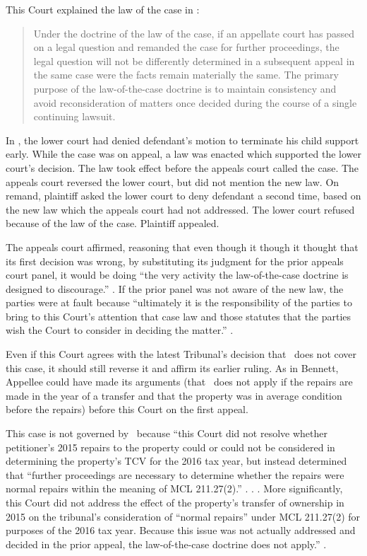 \documentclass[12pt,\documentclassflag]{michiganCourtOfAppealsBrief}
\begin{document}
This Court explained the law of the case in :

\begin{quote}
  Under the doctrine of the law of the case, if an appellate court has passed on a legal question and remanded the case for further proceedings, the legal question will not be differently determined in a subsequent appeal in the same case were the facts remain materially the same. The primary purpose of the law-of-the-case doctrine is to maintain consistency and avoid reconsideration of matters once decided during the course of a single  %
  continuing lawsuit.
\end{quote}

In \cite{Bennett}, the lower court had denied defendant's motion to terminate his child support early.
While the case was on appeal, a law was enacted which supported the lower court's decision. The law took effect before the appeals court called the case. The appeals court reversed the lower court, but did not mention the new law. On remand, plaintiff asked the lower court to deny defendant a second time, based on the new law which the appeals court had not addressed. The lower court refused because of the law of the case. Plaintiff appealed.

The appeals court affirmed, reasoning that even though it though it thought that its first decision was wrong, by substituting its judgment for the prior appeals court panel, it would be doing ``the very activity the law-of-the-case doctrine is designed to discourage.'' . If the prior panel was not aware of the new law, the parties were at fault because ``ultimately it is the responsibility of the parties to bring to this Court's attention that case law and those statutes that the parties wish the Court to consider in deciding the matter.'' .

Even if this Court agrees with the latest Tribunal's decision that \mathieuGast\ does not cover this case, it should still reverse it and affirm its earlier ruling. As in Bennett, Appellee could have made its arguments (that \mathieuGast\ does not apply if the repairs are made in the year of a transfer and that the property was in average condition before the repairs) before this Court on the first appeal.


This case is not governed by \cite[s]{Patru 1}\ because ``this Court did not resolve whether petitioner's 2015 repairs to the property could or could not be considered in determining the property's TCV for the 2016 tax year, but instead
determined that ``further proceedings are necessary to determine whether the repairs were normal
repairs within the meaning of MCL 211.27(2).'' . . . More significantly, this Court
did not address the effect of the property's transfer of ownership in 2015 on the tribunal's
consideration of ``normal repairs'' under MCL 211.27(2) for purposes of the 2016 tax year.
Because this issue was not actually addressed and decided in the prior appeal, the law-of-the-case
doctrine does not apply.'' .
\end{document}
